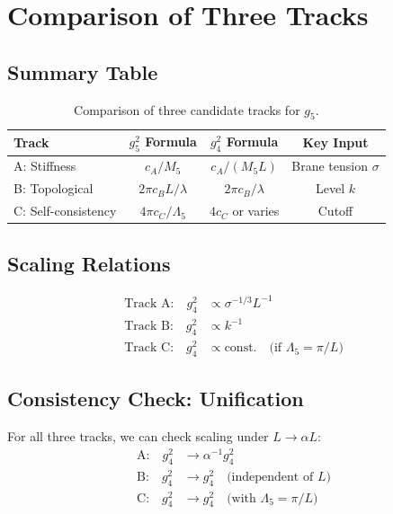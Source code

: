 \documentclass[11pt,a4paper]{article}
\begin{document}
\section{Comparison of Three Tracks}

\subsection{Summary Table}

\begin{table}[h]
\centering
\begin{tabular}{lccc}
\toprule
Track & $g_5^2$ Formula & $g_4^2$ Formula & Key Input \\
\midrule
A: Stiffness & $c_A/M_5$ & $c_A/(M_5 L)$ & Brane tension $\sigma$ \\
B: Topological & $2\pi c_B L/\lambda$ & $2\pi c_B/\lambda$ & Level $k$ \\
C: Self-consistency & $4\pi c_C/\Lambda_5$ & $4c_C$ or varies & Cutoff \\
\bottomrule
\end{tabular}
\caption{Comparison of three candidate tracks for $g_5$.}
\label{tab:tracks}
\end{table}

\subsection{Scaling Relations}

\begin{align}
\label{eq:track-a-scale}
\text{Track A:} \quad g_4^2 &\propto \sigma^{-1/3} L^{-1} \\
\label{eq:track-b-scale}
\text{Track B:} \quad g_4^2 &\propto k^{-1} \\
\label{eq:track-c-scale}
\text{Track C:} \quad g_4^2 &\propto \text{const.} \quad \text{(if } \Lambda_5 = \pi/L\text{)}
\end{align}

\subsection{Consistency Check: Unification}

For all three tracks, we can check scaling under $L \to \alpha L$:
\begin{align}
\label{eq:scale-a}
\text{A:} \quad g_4^2 &\to \alpha^{-1} g_4^2 \\
\label{eq:scale-b}
\text{B:} \quad g_4^2 &\to g_4^2 \quad \text{(independent of } L\text{)} \\
\label{eq:scale-c}
\text{C:} \quad g_4^2 &\to g_4^2 \quad \text{(with } \Lambda_5 = \pi/L\text{)}
\end{align}
\end{document}
